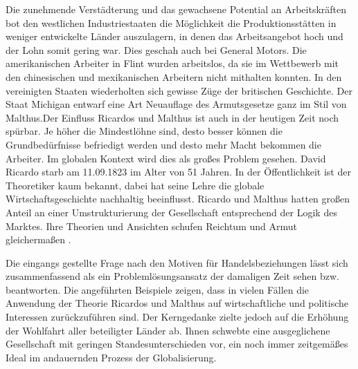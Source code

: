 Die zunehmende Verst{\"a}dterung und das gewachsene Potential an Arbeitskr{\"a}ften bot den westlichen Industriestaaten die M{\"o}glichkeit die Produktionsst{\"a}tten in weniger entwickelte L{\"a}nder auszulagern, in denen das Arbeitsangebot hoch und der Lohn somit gering war. Dies geschah auch bei General Motors. Die amerikanischen Arbeiter in Flint wurden arbeitslos, da sie im Wettbewerb mit den chinesischen und mexikanischen Arbeitern nicht mithalten konnten. In den vereinigten Staaten wiederholten sich gewisse Z{\"u}ge der britischen Geschichte. Der Staat Michigan entwarf eine Art Neuauflage des Armutsgesetze ganz im Stil von Malthus.\newline Der Einfluss Ricardos und Malthus ist auch in der heutigen Zeit noch sp{\"u}rbar. Je h{\"o}her die Mindestl{\"o}hne sind, desto besser k{\"o}nnen die Grundbed{\"u}rfnisse befriedigt werden und desto mehr Macht bekommen die Arbeiter. Im globalen Kontext wird dies als gro{\ss}es Problem gesehen. \newline David Ricardo starb am 11.09.1823 im Alter von 51 Jahren. In der {\"O}ffentlichkeit ist der Theoretiker kaum bekannt, dabei hat seine Lehre die globale Wirtschaftsgeschichte nachhaltig beeinflusst. Ricardo und Malthus hatten gro{\ss}en Anteil an einer Umstrukturierung der Gesellschaft entsprechend der Logik des Marktes. Ihre Theorien und Ansichten schufen Reichtum und Armut gleicherma{\ss}en \citep{Heilbroner.2011}.\newline


Die eingangs gestellte Frage nach den Motiven für Handelsbeziehungen lässt sich zusammenfassend als ein Problemlösungsansatz der damaligen Zeit sehen bzw. beantworten. Die angeführten Beispiele zeigen, dass in vielen Fällen die Anwendung der Theorie Ricardos und Malthus auf wirtschaftliche und politische Interessen zurückzuführen sind. Der Kerngedanke zielte jedoch auf die Erhöhung der Wohlfahrt aller beteiligter Länder ab. Ihnen schwebte eine ausgeglichene Gesellschaft mit geringen Standesunterschieden vor, ein noch immer zeitgemä{\ss}es Ideal im andauernden Prozess der Globalisierung.
 

